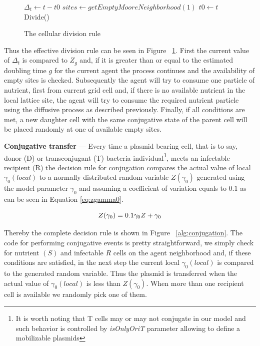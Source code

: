 \begin{figure}
\begin{algorithmic}[1]
\State $\Delta_t \gets t - t0$
\State $sites \gets getEmptyMooreNeighborhood(1)$
\State $t0 \gets t$
\State Divide()
\EndIf
\EndIf
\EndIf
\EndProcedure
\end{algorithmic}
\caption[Division]{\label{alg:division}The cellular division rule}
\end{figure}

Thus the effective division rule can be seen in Figure ~\ref{alg:division}.  First the current value of $\Delta_t$ is compared to $Z_g$ and, if it is greater than or equal to the estimated doubling time $g$ for the current agent the process continues and the availability of empty sites is checked.  Subsequently the agent will try to consume one particle of nutrient, first from current grid cell and, if there is no available nutrient in the local lattice site, the agent will try to consume the required nutrient particle using the diffusive process as described previously. Finally, if all conditions are met, a new daughter cell with the same conjugative state of the parent cell will be placed randomly at one of available empty sites.


{\bf Conjugative transfer} --- Every time a plasmid bearing cell, that is to say, donor (D) or transconjugant (T) bacteria individual\footnote{It is worth noting that T cells may or may not conjugate in our model and such behavior is controlled by {\it isOnlyOriT} parameter allowing to define a mobilizable plasmids}, meets an infectable recipient (R) the decision rule for conjugation compares the actual value of local $\gamma_0(local)$ to a normally distributed random variable $Z(\gamma_0)$ generated using the model parameter $\gamma_0$ and assuming a coefficient of variation equals to $0.1$ as can be seen in Equation \eqref{eq:zgamma0}.

\begin{equation}
\label{eq:zgamma0}
\centering 
Z(\gamma_0)= 0.1 \gamma_0 Z + \gamma_0
\end{equation}

Thereby the complete decision rule is shown in Figure ~\ref{alg:conjugation}. The code for performing conjugative events is pretty straightforward, we simply check for nutrient $(S)$ and infectable $R$ cells on the agent neighborhood and, if these conditions are satisfied, in the next step the current local $\gamma_0(local)$ is compared to the generated random variable. Thus the plasmid is transferred when the actual value of $\gamma_0(local)$ is less than $ Z(\gamma_0)$. When more than one recipient cell is available we randomly pick one of them.

